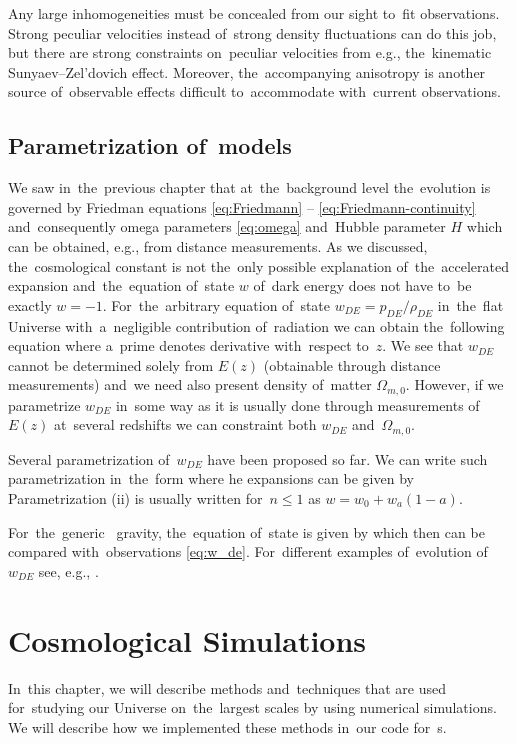 {Any large inhomogeneities must be concealed from our sight to~fit observations. Strong peculiar velocities instead of~strong density fluctuations can do this job, but there are strong constraints on~peculiar velocities from e.g., the~kinematic Sunyaev--Zel'dovich effect. Moreover, the~accompanying anisotropy is another source of~observable effects difficult to~accommodate with~current observations.
} 
\section{Parametrization of~models}
We saw in~the~previous chapter that at~the~background level the~evolution is governed by Friedman equations \eqref{eq:Friedmann} -- \eqref{eq:Friedmann-continuity} and~consequently omega parameters \eqref{eq:omega} and~Hubble parameter $H$ which can be obtained, e.g., from distance measurements. As we discussed, the~cosmological constant is not the~only possible explanation of~the~accelerated expansion and~the~equation of~state \(w\) of~dark energy does not have to~be exactly \(w=-1\). For~the~arbitrary equation of~state $w_{DE}=p_{DE}/\rho_{DE}$ in~the~flat Universe with~a~negligible contribution of~radiation we can obtain the~following equation
where a~prime denotes derivative with~respect to~\(z\). We see that \(w_{DE}\) cannot be determined solely from \(E(z)\) (obtainable through distance measurements) and~we need also present density of~matter \(\Omega_{m,0}\). However, if we parametrize \(w_{DE}\) in~some way as it is usually done through measurements of~\(E(z)\) at~several redshifts we can constraint both \(w_{DE}\) and~\(\Omega_{m,0}\).

Several parametrization  of~\(w_{DE}\) have been proposed so far. We can write such parametrization  in~the~form
where he expansions can be given by
Parametrization (ii) is usually written for~\(n\leq1\) as \(w=w_0+w_a(1-a)\).

For~the~generic \fR\ gravity, the~equation of~state is given by \parencite{2013qopu.conf...73B}
which then can be compared with~observations \eqref{eq:w_de}. For~different examples of~evolution of~$w_{DE}$ see, e.g., \textcite{2020arXiv200707717A}. \clearpage{}
\clearpage{}\chapter{Cosmological Simulations}
\label{chpt:cosmo_sim}
In~this chapter, we will describe methods and~techniques that are used for~studying our Universe on~the~largest scales by using numerical simulations. We will describe how we implemented these methods in~our code for~\nbodysim s.

